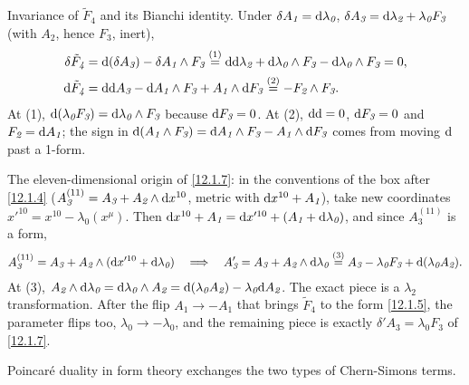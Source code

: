 \begin{tcolorbox}[breakable]
	\begin{remark}
		Invariance of $\tilde F_{\textit{4}}$ and its Bianchi identity. Under $\delta A_{\textit{1}}=\mathrm{d}\lambda_{\textit{0}}$, $\delta A_{\textit{3}}=\mathrm{d}\lambda_{\textit{2}}+\lambda_{\textit{0}}F_{\textit{3}}$ (with $A_{\textit{2}}$, hence $F_{\textit{3}}$, inert),
		\begin{align*}
			\delta\tilde F_{\textit{4}}&=\mathrm{d}(\delta A_{\textit{3}})-\delta A_{\textit{1}}\wedge F_{\textit{3}}
			\overset{(1)}{=} \mathrm{d}\mathrm{d}\lambda_{\textit{2}}+\mathrm{d}\lambda_{\textit{0}}\wedge F_{\textit{3}}-\mathrm{d}\lambda_{\textit{0}}\wedge F_{\textit{3}} = 0 ,\\
			\mathrm{d}\tilde F_{\textit{4}}&=\mathrm{d}\mathrm{d} A_{\textit{3}}-\mathrm{d} A_{\textit{1}}\wedge F_{\textit{3}}+A_{\textit{1}}\wedge\mathrm{d} F_{\textit{3}}
			\overset{(2)}{=} -F_{\textit{2}}\wedge F_{\textit{3}} .
		\end{align*}
		At (1), $\mathrm{d}(\lambda_{\textit{0}}F_{\textit{3}})=\mathrm{d}\lambda_{\textit{0}}\wedge F_{\textit{3}}$ because $\mathrm{d} F_{\textit{3}}=0$. At (2), $\mathrm{d}\mathrm{d}=0$, $\mathrm{d} F_{\textit{3}}=0$ and $F_{\textit{2}}=\mathrm{d} A_{\textit{1}}$; the sign in $\mathrm{d}(A_{\textit{1}}\wedge F_{\textit{3}})=\mathrm{d} A_{\textit{1}}\wedge F_{\textit{3}}-A_{\textit{1}}\wedge\mathrm{d} F_{\textit{3}}$ comes from moving $\mathrm{d}$ past a 1-form.

		The eleven-dimensional origin of \eqref{12.1.7}: in the conventions of the box after \eqref{12.1.4} ($A^{(11)}_{\textit{3}}=A_{\textit{3}}+A_{\textit{2}}\wedge\mathrm{d} x^{10}$, metric with $\mathrm{d} x^{10}+A_{\textit{1}}$), take new coordinates $x'^{10}=x^{10}-\lambda_{\textit{0}}(x^{\mu})$. Then $\mathrm{d} x^{10}+A_{\textit{1}}=\mathrm{d} x'^{10}+(A_{\textit{1}}+\mathrm{d}\lambda_{\textit{0}})$, and since $A^{(11)}_{\textit{3}}$ is a form,
		\begin{align*}
			A^{(11)}_{\textit{3}}=A_{\textit{3}}+A_{\textit{2}}\wedge(\mathrm{d} x'^{10}+\mathrm{d}\lambda_{\textit{0}})
			\quad\Longrightarrow\quad
			A'_{\textit{3}}=A_{\textit{3}}+A_{\textit{2}}\wedge\mathrm{d}\lambda_{\textit{0}}
			\overset{(3)}{=} A_{\textit{3}}-\lambda_{\textit{0}}F_{\textit{3}}+\mathrm{d}(\lambda_{\textit{0}}A_{\textit{2}}) .
		\end{align*}
		At (3), $A_{\textit{2}}\wedge\mathrm{d}\lambda_{\textit{0}}=\mathrm{d}\lambda_{\textit{0}}\wedge A_{\textit{2}}=\mathrm{d}(\lambda_{\textit{0}}A_{\textit{2}})-\lambda_{\textit{0}}\mathrm{d} A_{\textit{2}}$. The exact piece is a $\lambda_{\textit{2}}$ transformation. After the flip $A_{\textit{1}}\to-A_{\textit{1}}$ that brings $\tilde F_{\textit{4}}$ to the form \eqref{12.1.5}, the parameter flips too, $\lambda_{\textit{0}}\to-\lambda_{\textit{0}}$, and the remaining piece is exactly $\delta'A_{\textit{3}}=\lambda_{\textit{0}}F_{\textit{3}}$ of \eqref{12.1.7}.
	\end{remark}
\end{tcolorbox}
Poincaré duality in form theory exchanges the two types of Chern-Simons terms.


